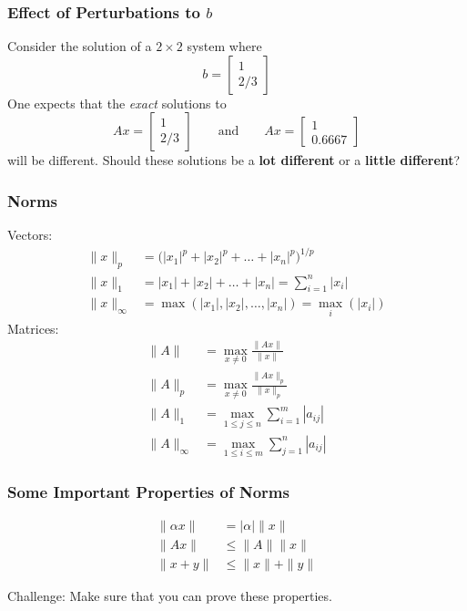 \documentclass[10pt]{beamer}
\newcommand{\matdim}[2]{\ensuremath{#1\times#2}}
\begin{document}
\begin{frame}
\frametitle{Effect of Perturbations to $b$}

Consider the solution of a \matdim{2}{2} system where
\begin{equation*}
    b = \begin{bmatrix}1 \\ 2/3 \end{bmatrix}
\end{equation*}
One expects that the
\emph{exact} solutions to
\begin{equation*}
    Ax = \begin{bmatrix}1 \\ 2/3 \end{bmatrix}
    \ \ \ \ \ \ \ \ \
    \text{and}
    \ \ \ \ \ \ \ \ \
    Ax = \begin{bmatrix}1 \\ 0.6667 \end{bmatrix}
\end{equation*}
will be different.  Should these solutions be a \textbf{lot different}
or a \textbf{little different}?

\end{frame}
\begin{frame}
\frametitle{Norms}
Vectors:
\begin{align*}
    \|x\|_{p} &= \bigl( |x_1|^p + |x_2|^p + \ldots + |x_n|^p \bigr)^{1/p}\\
    \|x\|_{1} &= |x_1| + |x_2| + \ldots + |x_n| = \sum_{i=1}^{n}{|x_i|}\\
    \|x\|_{\infty} &= \max \left(|x_1|, |x_2|, \ldots, |x_n| \right)
                      = \underset{i}{\max} \left( |x_i| \right)
\end{align*}
Matrices:
\begin{align*}
  \|A\| &= \max_{x\ne 0} \frac{\|Ax\|}{\|x\|}\\
  \|A\|_p &= \max_{x\ne 0} \frac{\|Ax\|_p}{\|x\|_p}\\
  \|A\|_1 &= \max_{1\leq j \leq n} \sum_{i=1}^{m}|a_{ij}|\\
  \|A\|_{\infty} &= \max_{1\leq i \leq m} \sum_{j=1}^{n}|a_{ij}|
\end{align*}

\end{frame}
\begin{frame}
\frametitle{Some Important Properties of Norms}
\begin{align*}
     \|\alpha x\| &= |\alpha| \|x\|\\
     \|Ax\| &\le \|A\| \|x\| \\
     \|x+y\| &\le \|x\| + \| y \|
\end{align*}
\begin{alertblock}{}
Challenge: Make sure that you can prove these properties.
\end{alertblock}
\end{frame}
\end{document}
